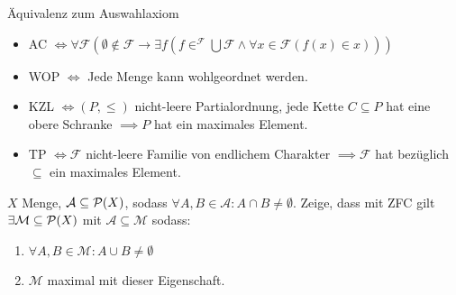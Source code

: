 \documentclass[12pt]{article}
\begin{document}
\begin{remark}{Äquivalenz zum Auswahlaxiom}{}
    \begin{itemize}
        \item AC $\iff \forall \mathcal{F} \left(\emptyset \notin \mathcal{F} \rightarrow \exists f (f \in ^{\mathcal{F}}\bigcup \mathcal{F} \land \forall x \in \mathcal{F} (f(x) \in x))\right)$
        \item WOP $\iff$ Jede Menge kann wohlgeordnet werden.
        \item KZL $\iff (P, \leq)$ nicht-leere Partialordnung, jede Kette $C \subseteq P$ hat eine obere Schranke $\implies P$ hat ein maximales Element.
        \item TP $\iff \mathcal{F}$ nicht-leere Familie von endlichem Charakter $\implies \mathcal{F}$ hat bezüglich $\subseteq$ ein maximales Element.
    \end{itemize}
\end{remark}

\begin{exercise}{}{}
    $X$ Menge, $\mathcal{A} \subseteq \mathcal{P}(X)$, sodass $\forall A, B \in \mathcal{A} : A \cap B \neq \emptyset$. Zeige, dass mit ZFC gilt $\exists \mathcal{M} \subseteq \mathcal{P}(X)$ mit $\mathcal{A} \subseteq \mathcal{M}$ sodass:

    \begin{enumerate}
        \item $\forall A, B \in \mathcal{M} : A \cup B \neq \emptyset$
        \item $\mathcal{M}$ maximal mit dieser Eigenschaft.
    \end{enumerate}
\end{exercise}
\end{document}
